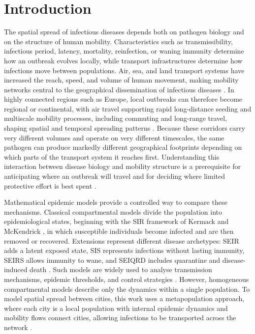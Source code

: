 \section{Introduction}

The spatial spread of infectious diseases depends both on pathogen biology and on the structure of human mobility. Characteristics such as transmissibility, infectious period, latency, mortality, reinfection, or waning immunity determine how an outbreak evolves locally, while transport infrastructures determine how infections move between populations. Air, sea, and land transport systems have increased the reach, speed, and volume of human movement, making mobility networks central to the geographical dissemination of infectious diseases \cite{tatem2006global}. In highly connected regions such as Europe, local outbreaks can therefore become regional or continental, with air travel supporting rapid long-distance seeding \cite{colizza:airline} and multiscale mobility processes, including commuting and long-range travel, shaping spatial and temporal spreading patterns \cite{balcan:multiscale}. Because these corridors carry very different volumes and operate on very different timescales, the same pathogen can produce markedly different geographical footprints depending on which parts of the transport system it reaches first. Understanding this interaction between disease biology and mobility structure is a prerequisite for anticipating where an outbreak will travel and for deciding where limited protective effort is best spent \cite{brockmann2013hidden}.

Mathematical epidemic models provide a controlled way to compare these mechanisms. Classical compartmental models divide the population into epidemiological states, beginning with the SIR framework of Kermack and McKendrick \cite{kermack:sir}, in which susceptible individuals become infected and are then removed or recovered. Extensions represent different disease archetypes: SEIR adds a latent exposed state, SIS represents infections without lasting immunity, SEIRS allows immunity to wane, and SEIQRD includes quarantine and disease-induced death \cite{paul2023fractional}. Such models are widely used to analyse transmission mechanisms, epidemic thresholds, and control strategies \cite{hethcote2000mathematics}. However, homogeneous compartmental models describe only the dynamics within a single population. To model spatial spread between cities, this work uses a metapopulation approach, where each city is a local population with internal epidemic dynamics and mobility flows connect cities, allowing infections to be transported across the network \cite{colizza2008metapopulation}.


